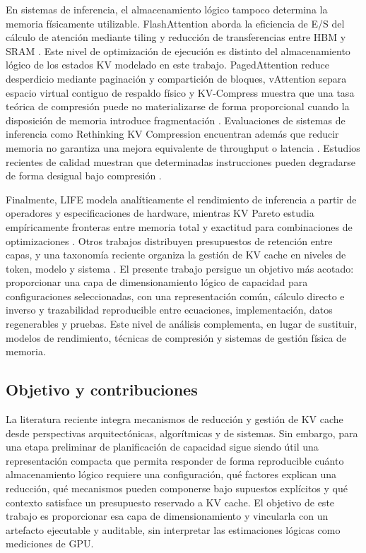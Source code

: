 \documentclass[a4paper,twocolumn]{article}
\begin{document}
En sistemas de inferencia, el almacenamiento lógico tampoco determina la memoria físicamente utilizable. FlashAttention aborda la eficiencia de E/S del cálculo de atención mediante tiling y reducción de transferencias entre HBM y SRAM \cite{dao2022flashattention}. Este nivel de optimización de ejecución es distinto del almacenamiento lógico de los estados KV modelado en este trabajo. PagedAttention reduce desperdicio mediante paginación y compartición de bloques, vAttention separa espacio virtual contiguo de respaldo físico y KV-Compress muestra que una tasa teórica de compresión puede no materializarse de forma proporcional cuando la disposición de memoria introduce fragmentación \cite{kwon2023efficient,prabhu2025vattention,rehg2024kvcompress}. Evaluaciones de sistemas de inferencia como Rethinking KV Compression encuentran además que reducir memoria no garantiza una mejora equivalente de throughput o latencia \cite{gao2025rethinking}. Estudios recientes de calidad muestran que determinadas instrucciones pueden degradarse de forma desigual bajo compresión \cite{chen2026pitfalls}.

Finalmente, LIFE modela analíticamente el rendimiento de inferencia a partir de operadores y especificaciones de hardware, mientras KV Pareto estudia empíricamente fronteras entre memoria total y exactitud para combinaciones de optimizaciones \cite{patwari2025life,gokhale2026kvpareto}. Otros trabajos distribuyen presupuestos de retención entre capas, y una taxonomía reciente organiza la gestión de KV cache en niveles de token, modelo y sistema \cite{li2024xkv,li2024kvsurvey}. El presente trabajo persigue un objetivo más acotado: proporcionar una capa de dimensionamiento lógico de capacidad para configuraciones seleccionadas, con una representación común, cálculo directo e inverso y trazabilidad reproducible entre ecuaciones, implementación, datos regenerables y pruebas. Este nivel de análisis complementa, en lugar de sustituir, modelos de rendimiento, técnicas de compresión y sistemas de gestión física de memoria.

\subsection{Objetivo y contribuciones}
La literatura reciente integra mecanismos de reducción y gestión de KV cache desde perspectivas arquitectónicas, algorítmicas y de sistemas. Sin embargo, para una etapa preliminar de planificación de capacidad sigue siendo útil una representación compacta que permita responder de forma reproducible cuánto almacenamiento lógico requiere una configuración, qué factores explican una reducción, qué mecanismos pueden componerse bajo supuestos explícitos y qué contexto satisface un presupuesto reservado a KV cache. El objetivo de este trabajo es proporcionar esa capa de dimensionamiento y vincularla con un artefacto ejecutable y auditable, sin interpretar las estimaciones lógicas como mediciones de GPU.
\end{document}
